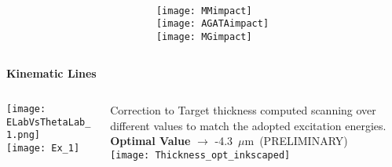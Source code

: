 \documentclass[10pt]{beamer}
\begin{document}
\begin{frame}
\begin{columns}
\begin{column}{0.6\textwidth}
		
	\end{column}
	\begin{column}{0.4\textwidth}
		\vspace{-0.08\textheight}\\
		\hspace{0.4\textwidth}
		\texttt{[image: MMimpact]}\\
		\hspace{0.\textwidth}
		\texttt{[image: AGATAimpact]}\\
		\hspace{0.4\textwidth}
		\texttt{[image: MGimpact]}\\

	\end{column}
\end{columns}

\end{frame}

\begin{frame}
\centering
\vspace{0.03\textheight}
\textbf{\Large Kinematic Lines}
\vspace{0.01\textheight}
\begin{columns}
	\begin{column}{0.4\textwidth}
		\centering
		\texttt{[image: ELabVsThetaLab\_1.png]}\\
		\texttt{[image: Ex\_1]}\\
	\end{column}
	\begin{column}{0.6\textwidth}
		\centering
		\footnotesize Correction to Target thickness computed scanning over different values to match the adopted excitation energies.\\
		 \textbf{Optimal Value} $\rightarrow$ -4.3~$\mu$m~(PRELIMINARY)\\
		
		\vspace{0.05\textheight}
		\texttt{[image: Thickness\_opt\_inkscaped]}\\
	\end{column}
\end{columns}
\end{frame}
\end{document}
